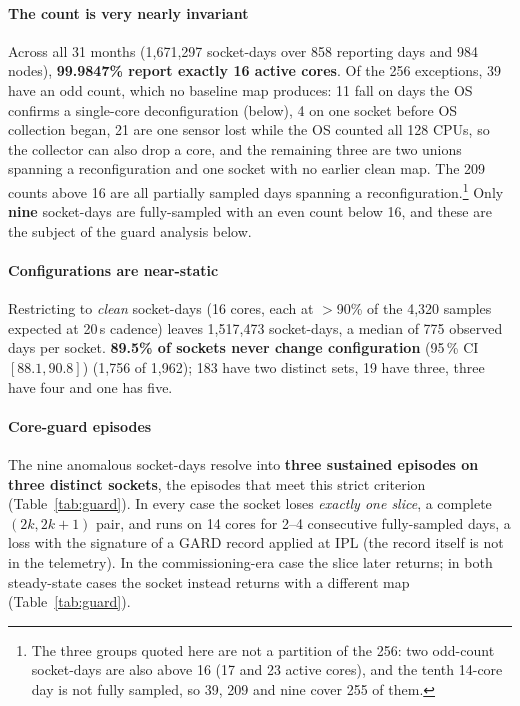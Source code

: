 \documentclass[10pt,conference]{IEEEtran}
\begin{document}
\paragraph*{The count is very nearly invariant} Across all 31 months (1{,}671{,}297 socket-days
over 858 reporting days and 984 nodes), \textbf{99.9847\% report exactly 16 active cores}. Of the 256
exceptions, 39 have an odd count, which no baseline map produces: 11 fall on days the OS
confirms a single-core deconfiguration (below), 4 on one socket before OS collection began, 21
are one sensor lost while the OS counted all 128 CPUs, so the collector can also drop a core, and
the remaining three are two unions spanning a reconfiguration and one socket with no earlier clean
map. The 209 counts above 16 are all partially sampled days spanning a
reconfiguration.\footnote{The three groups quoted here are not a partition of the 256: two
odd-count socket-days are also above 16 (17 and 23 active cores), and the tenth 14-core day is not
fully sampled, so 39, 209 and nine cover 255 of them.} Only \textbf{nine} socket-days are
fully-sampled with an even count below 16, and these are the subject of the guard analysis below.

\paragraph*{Configurations are near-static} Restricting to \emph{clean} socket-days (16 cores, each
at $>$90\% of the 4{,}320 samples expected at 20\,s cadence) leaves 1{,}517{,}473 socket-days, a
median of 775 observed days per socket. \textbf{89.5\% of sockets never change configuration} (95\,\% CI $[88.1,90.8]$)
(1{,}756 of 1{,}962); 183 have two distinct sets, 19 have three, three have four and one has five.

\paragraph*{Core-guard episodes} The nine anomalous socket-days resolve into
\textbf{three sustained episodes on three distinct sockets}, the episodes that meet this strict
criterion (Table~\ref{tab:guard}). In every case the socket loses \emph{exactly one slice}, a
complete $(2k,2k{+}1)$ pair, and runs on 14 cores for 2--4 consecutive fully-sampled days, a loss
with the signature of a GARD record applied at IPL (the record itself is not in the telemetry). In
the commissioning-era case the slice later returns; in both steady-state cases the socket instead
returns with a different map (Table~\ref{tab:guard}).
\end{document}
